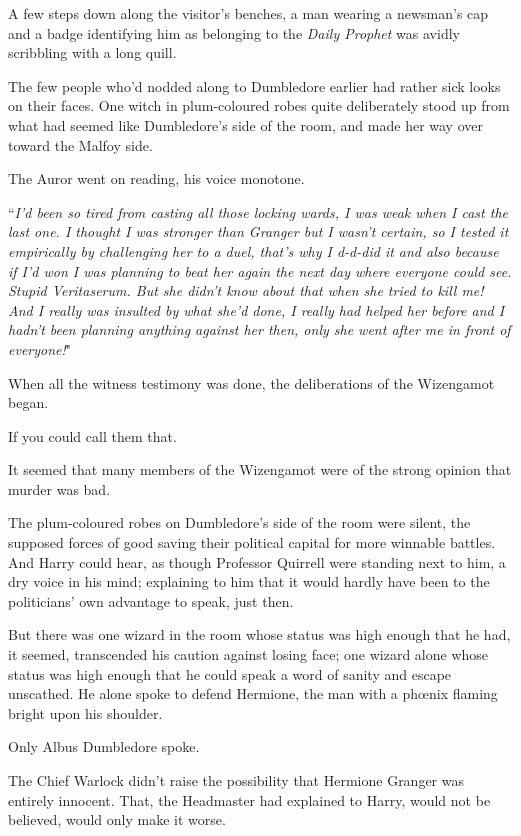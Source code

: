 A few steps down along the visitor's benches, a man wearing a newsman's cap and a badge identifying him as belonging to the \emph{Daily Prophet} was avidly scribbling with a long quill.

The few people who'd nodded along to Dumbledore earlier had rather sick looks on their faces. One witch in plum-coloured robes quite deliberately stood up from what had seemed like Dumbledore's side of the room, and made her way over toward the Malfoy side.

The Auror went on reading, his voice monotone.

``\emph{I'd been so tired from casting all those locking wards, I was weak when I cast the last one. I thought I was stronger than Granger but I wasn't certain, so I tested it empirically by challenging her to a duel, that's why I d-d-did it and also because if I'd won I was planning to beat her again the next day where everyone could see. Stupid Veritaserum. But \emph{she} didn't know about that when she tried to \emph{kill} me! And I really was insulted by what she'd done, I really had helped her before and I hadn't been planning anything against her then, only \emph{she} went after \emph{me} in front of everyone!}"

When all the witness testimony was done, the deliberations of the Wizengamot began.

If you could call them that.

It seemed that many members of the Wizengamot were of the strong opinion that murder was bad.

The plum-coloured robes on Dumbledore's side of the room were silent, the supposed forces of good saving their political capital for more winnable battles. And Harry could hear, as though Professor Quirrell were standing next to him, a dry voice in his mind; explaining to him that it would hardly have been to the politicians' own advantage to speak, just then.

But there was one wizard in the room whose status was high enough that he had, it seemed, transcended his caution against losing face; one wizard alone whose status was high enough that he could speak a word of sanity and escape unscathed. He alone spoke to defend Hermione, the man with a phœnix flaming bright upon his shoulder.

Only Albus Dumbledore spoke.

The Chief Warlock didn't raise the possibility that Hermione Granger was entirely innocent. That, the Headmaster had explained to Harry, would not be believed, would only make it worse.

